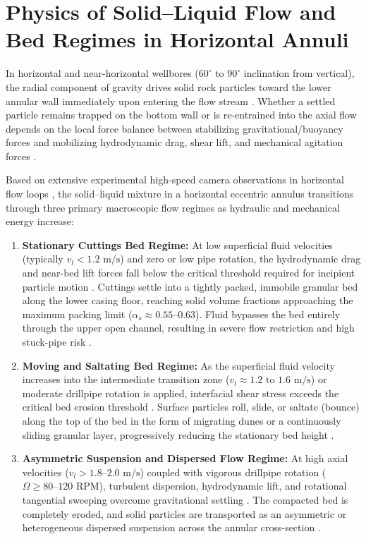 \section{Physics of Solid--Liquid Flow and Bed Regimes in Horizontal Annuli}
In horizontal and near-horizontal wellbores ($60^\circ$ to $90^\circ$ inclination from vertical), the radial component of gravity drives solid rock particles toward the lower annular wall immediately upon entering the flow stream \citep{Tomren1986, Osgouei2010}. Whether a settled particle remains trapped on the bottom wall or is re-entrained into the axial flow depends on the local force balance between stabilizing gravitational/buoyancy forces and mobilizing hydrodynamic drag, shear lift, and mechanical agitation forces \citep{Khalili2025, Li2026}.

Based on extensive experimental high-speed camera observations in horizontal flow loops \citep{Tomren1986, Osgouei2010}, the solid--liquid mixture in a horizontal eccentric annulus transitions through three primary macroscopic flow regimes as hydraulic and mechanical energy increase:
\begin{enumerate}
    \item \textbf{Stationary Cuttings Bed Regime:} At low superficial fluid velocities (typically $v_l < 1.2\text{ m/s}$) and zero or low pipe rotation, the hydrodynamic drag and near-bed lift forces fall below the critical threshold required for incipient particle motion \citep{Osgouei2010, Li2026}. Cuttings settle into a tightly packed, immobile granular bed along the lower casing floor, reaching solid volume fractions approaching the maximum packing limit ($\alpha_s \approx 0.55\text{--}0.63$). Fluid bypasses the bed entirely through the upper open channel, resulting in severe flow restriction and high stuck-pipe risk \citep{Shehab2015, Li2026}.
    \item \textbf{Moving and Saltating Bed Regime:} As the superficial fluid velocity increases into the intermediate transition zone ($v_l \approx 1.2\text{ to } 1.6\text{ m/s}$) or moderate drillpipe rotation is applied, interfacial shear stress exceeds the critical bed erosion threshold \citep{Osgouei2010, Khalili2025}. Surface particles roll, slide, or saltate (bounce) along the top of the bed in the form of migrating dunes or a continuously sliding granular layer, progressively reducing the stationary bed height \citep{Osgouei2010, Li2026}.
    \item \textbf{Asymmetric Suspension and Dispersed Flow Regime:} At high axial velocities ($v_l > 1.8\text{--}2.0\text{ m/s}$) coupled with vigorous drillpipe rotation ($\Omega \ge 80\text{--}120\text{ RPM}$), turbulent dispersion, hydrodynamic lift, and rotational tangential sweeping overcome gravitational settling \citep{Osgouei2010, Shehab2015, Khalili2025}. The compacted bed is completely eroded, and solid particles are transported as an asymmetric or heterogeneous dispersed suspension across the annular cross-section \citep{Osgouei2010, Li2026}.
\end{enumerate}

